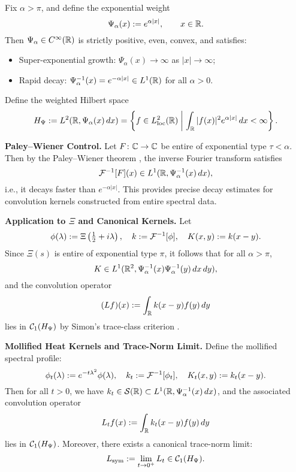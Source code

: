 \begin{definition}\label{def:exponential_weight}
Fix \( \alpha > \pi \), and define the exponential weight
\[
\Psi_\alpha(x) := e^{\alpha |x|}, \qquad x \in \mathbb{R}.
\]
Then \( \Psi_\alpha \in C^\infty(\mathbb{R}) \) is strictly positive, even, convex, and satisfies:
\begin{itemize}
    \item Super-exponential growth: \( \Psi_\alpha(x) \to \infty \) as \( |x| \to \infty \);
    \item Rapid decay: \( \Psi_\alpha^{-1}(x) = e^{-\alpha |x|} \in L^1(\mathbb{R}) \) for all \( \alpha > 0 \).
\end{itemize}

Define the weighted Hilbert space
\[
H_{\Psi} := L^2(\mathbb{R}, \Psi_\alpha(x)\, dx) = \left\{ f \in L^2_{\mathrm{loc}}(\mathbb{R}) \;\middle|\; \int_{\mathbb{R}} |f(x)|^2 e^{\alpha |x|}\, dx < \infty \right\}.
\]

\medskip
\noindent\textbf{Paley--Wiener Control.}
Let \( F \colon \mathbb{C} \to \mathbb{C} \) be entire of exponential type \( \tau < \alpha \). Then by the Paley--Wiener theorem \cite[Thm.~3.2.4]{Levin1996EntireLectures}, the inverse Fourier transform satisfies
\[
\mathcal{F}^{-1}[F](x) \in L^1(\mathbb{R}, \Psi_\alpha^{-1}(x)\, dx),
\]
i.e., it decays faster than \( e^{-\alpha |x|} \). This provides precise decay estimates for convolution kernels constructed from entire spectral data.

\medskip
\noindent\textbf{Application to \(\Xi\) and Canonical Kernels.}
Let
\[
\phi(\lambda) := \Xi\left( \tfrac{1}{2} + i\lambda \right), \quad
k := \mathcal{F}^{-1}[\phi], \quad
K(x,y) := k(x - y).
\]
Since \( \Xi(s) \) is entire of exponential type \( \pi \), it follows that for all \( \alpha > \pi \),
\[
K \in L^1(\mathbb{R}^2, \Psi_\alpha^{-1}(x)\Psi_\alpha^{-1}(y)\, dx\,dy),
\]
and the convolution operator
\[
(Lf)(x) := \int_{\mathbb{R}} k(x - y) f(y)\, dy
\]
lies in \( \mathcal{C}_1(H_{\Psi}) \) by Simon's trace-class criterion \cite[Thm.~4.2]{Simon2005TraceIdeals}.

\medskip
\noindent\textbf{Mollified Heat Kernels and Trace-Norm Limit.}
Define the mollified spectral profile:
\[
\phi_t(\lambda) := e^{-t\lambda^2} \phi(\lambda), \quad
k_t := \mathcal{F}^{-1}[\phi_t], \quad
K_t(x,y) := k_t(x - y).
\]
Then for all \( t > 0 \), we have \( k_t \in \mathcal{S}(\mathbb{R}) \subset L^1(\mathbb{R}, \Psi_\alpha^{-1}(x)\, dx) \), and the associated convolution operator
\[
L_t f(x) := \int_{\mathbb{R}} k_t(x - y) f(y)\, dy
\]
lies in \( \mathcal{C}_1(H_{\Psi}) \). Moreover, there exists a canonical trace-norm limit:
\[
L_{\mathrm{sym}} := \lim_{t \to 0^+} L_t \in \mathcal{C}_1(H_{\Psi}).
\]


\end{definition}
